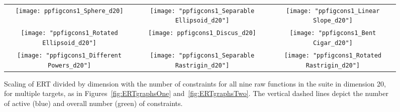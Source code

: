 \documentclass[sigconf]{acmart}
\begin{document}
{\begin{figure*}
 \begin{tabular}{@{}c@{}c@{}c@{}}
 \texttt{[image: ppfigcons1\_Sphere\_d20]} &
 \texttt{[image: "ppfigcons1\_Separable Ellipsoid\_d20"]} &
 \texttt{[image: "ppfigcons1\_Linear Slope\_d20"]}\\
 \texttt{[image: "ppfigcons1\_Rotated Ellipsoid\_d20"]} &
 \texttt{[image: ppfigcons1\_Discus\_d20]} &
 \texttt{[image: "ppfigcons1\_Bent Cigar\_d20"]}\\
 \texttt{[image: "ppfigcons1\_Different Powers\_d20"]} &
 \texttt{[image: "ppfigcons1\_Separable Rastrigin\_d20"]} &
 \texttt{[image: "ppfigcons1\_Rotated Rastrigin\_d20"]}\\
 \end{tabular}
\caption{
\label{fig:scalingconstraints20D}
Scaling of ERT divided by dimension with the number of constraints for all nine raw functions in the \bbobcons suite in dimension 20, for multiple targets, as in Figures~\ref{fig:ERTgraphsOne} and~\ref{fig:ERTgraphsTwo}. The vertical dashed lines depict the number of active (blue) and overall number (green) of constraints.
}
\end{figure*}



}
\end{document}
